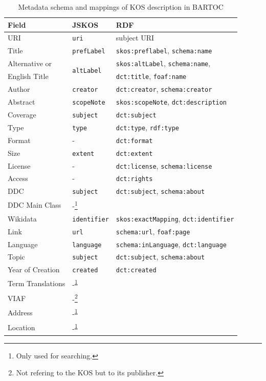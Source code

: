 \documentclass[12pt,a4paper]{llncs}
\begin{document}
\begin{table}\centering
\caption{Metadata schema and mappings of KOS description in BARTOC}
\label{table:fields}
\begin{tabular}{lll}
Field & JSKOS & RDF \\
\hline	
URI      & \verb|uri|       & subject URI \\
Title    & \verb|prefLabel| & \verb|skos:preflabel|, \verb|schema:name| \\
Alternative or &
\multirow{2}{*}{\texttt{altLabel}} 
 							& \verb|skos:altLabel|, \verb|schema:name|, \\
English Title               & & \verb|dct:title|, \verb|foaf:name| \\
Author   & \verb|creator|   & \verb|dct:creator|, \verb|schema:creator| \\
Abstract & \verb|scopeNote| & \verb|skos:scopeNote|, \verb|dct:description| \\
Coverage & \verb|subject|   & \verb|dct:subject| \\
Type     & \verb|type|      & \verb|dct:type|, \verb|rdf:type| \\
Format   & -				&  \verb|dct:format| \\
Size     & \verb|extent|    & \verb|dct:extent| \\
License  & -                & \verb|dct:license|, \verb|schema:license| \\ 
Access   & - 				& \verb|dct:rights| \\
DDC      & \verb|subject|   & \verb|dct:subject|, \verb|schema:about| \\
DDC Main Class & -\footnote{\label{fn:s}Only used for searching.} \\
Wikidata & \verb|identifier| & \verb|skos:exactMapping|, \verb|dct:identifier| \\
Link     & \verb|url|       & \verb|schema:url|, \verb|foaf:page| \\
Language & \verb|language|  & \verb|schema:inLanguage|, \verb|dct:language| \\
Topic    & \verb|subject| & \verb|dct:subject|, \verb|schema:about| \\
Year of Creation & \verb|created| & \verb|dct:created| \\
Term Translations  & -\textsuperscript{\ref{fn:s}} \\
VIAF & -\footnote{\label{fn:p}Not refering to the KOS but to its publisher.} \\
Address & -\textsuperscript{\ref{fn:p}} \\
Location & -\textsuperscript{\ref{fn:p}} \\
\end{tabular}
\end{table}
\end{document}
